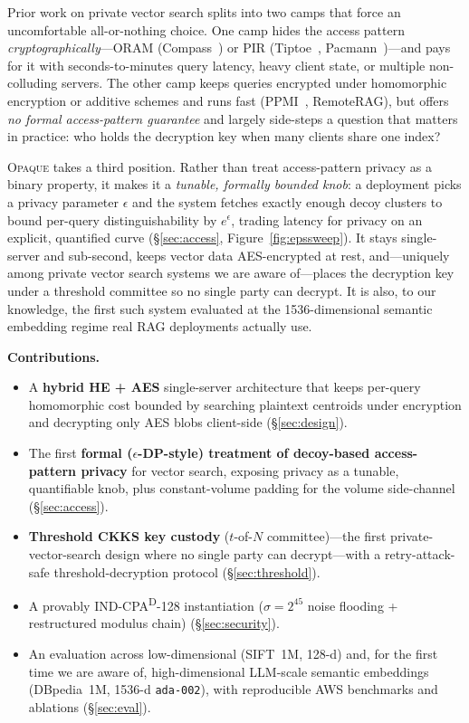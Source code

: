 \documentclass[11pt]{article}
\newcommand{\indcpad}{\mbox{IND-CPA\textsuperscript{D}}}
\newcommand{\opaque}{\textsc{Opaque}}
\begin{document}
Prior work on private vector search splits into two camps that force an
uncomfortable all-or-nothing choice. One camp hides the access pattern
\emph{cryptographically}---ORAM (Compass~\cite{compass}) or
PIR (Tiptoe~\cite{tiptoe}, Pacmann~\cite{pacmann})---and pays for it with
seconds-to-minutes query latency, heavy client state, or multiple
non-colluding servers. The other camp keeps queries encrypted under
homomorphic encryption or additive schemes and runs fast
(PPMI~\cite{ppmi}, RemoteRAG), but offers \emph{no formal access-pattern
guarantee} and largely side-steps a question that matters in practice: who
holds the decryption key when many clients share one index?

\opaque{} takes a third position. Rather than treat access-pattern privacy as a
binary property, it makes it a \emph{tunable, formally bounded knob}: a
deployment picks a privacy parameter $\epsilon$ and the system fetches exactly
enough decoy clusters to bound per-query distinguishability by $e^{\epsilon}$,
trading latency for privacy on an explicit, quantified curve
(\S\ref{sec:access}, Figure~\ref{fig:epssweep}). It stays single-server and
sub-second, keeps vector data AES-encrypted at rest, and---uniquely among
private vector search systems we are aware of---places the decryption key under
a threshold committee so no single party can decrypt. It is also, to our
knowledge, the first such system evaluated at the 1536-dimensional semantic
embedding regime real RAG deployments actually use.

\noindent\textbf{Contributions.}
\begin{itemize}
  \item A \textbf{hybrid HE + AES} single-server architecture that keeps per-query
    homomorphic cost bounded by searching plaintext centroids under encryption and
    decrypting only AES blobs client-side (\S\ref{sec:design}).
  \item The first \textbf{formal ($\epsilon$-DP-style) treatment of decoy-based
    access-pattern privacy} for vector search, exposing privacy as a tunable,
    quantifiable knob, plus constant-volume padding for the volume side-channel
    (\S\ref{sec:access}).
  \item \textbf{Threshold CKKS key custody} ($t$-of-$N$ committee)---the first
    private-vector-search design where no single party can decrypt---with a
    retry-attack-safe threshold-decryption protocol (\S\ref{sec:threshold}).
  \item A provably \indcpad{}-128 instantiation ($\sigma = 2^{45}$ noise flooding +
    restructured modulus chain) (\S\ref{sec:security}).
  \item An evaluation across low-dimensional (SIFT~1M, 128-d) and, for the first time
    we are aware of, high-dimensional LLM-scale semantic embeddings (DBpedia~1M,
    1536-d \texttt{ada-002}), with reproducible AWS benchmarks and ablations
    (\S\ref{sec:eval}).
\end{itemize}
\end{document}
